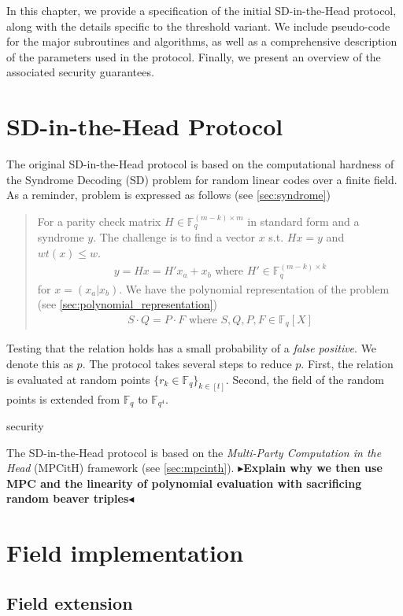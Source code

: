 \documentclass[twoside,11pt]{report}
\theoremstyle{definition}
\theoremstyle{plain}
\newcommand{\todo}[1]{{\color[rgb]{.5,0,0}\textbf{$\blacktriangleright$#1$\blacktriangleleft$}}}
\begin{document}
In this chapter, we provide a specification of the initial SD-in-the-Head protocol, along with the details specific to the threshold variant. We include pseudo-code for the major subroutines and algorithms, as well as a comprehensive description of the parameters used in the protocol. Finally, we present an overview of the associated security guarantees.


\section{SD-in-the-Head Protocol}
The original SD-in-the-Head protocol is based on the computational hardness of the Syndrome Decoding (SD) problem for random linear codes over a finite field. As a reminder, problem is expressed as follows (see \autoref{sec:syndrome})
\begin{quote}
  For a parity check matrix $H \in \mathbb{F}_q^{(m-k)\times m}$ in standard form and a syndrome $y$. The challenge is to find a vector $x$ s.t. $Hx = y$ and $wt(x) \leq w$.
  \begin{align*}
    y = Hx = H'x_a + x_b \text{ \ \ \ where \ \ \ } H' \in \mathbb{F}_q^{(m-k)\times k}
  \end{align*}
  for $x = (x_a | x_b)$. We have the polynomial representation of the problem (see \autoref{sec:polynomial_representation})
  \begin{align*}
    S\cdot Q = P\cdot F \text{ \ \ \ where \ \ \ } S, Q, P, F \in \mathbb{F}_q[X]
  \end{align*}
\end{quote}
\noindent Testing that the relation holds has a small probability of a \textit{false positive}. We denote this as $p$. The protocol takes several steps to reduce $p$. First, the relation is evaluated at random points $\{r_k \in \mathbb{F}_q\}_{k\in[t]}$. Second, the field of the random points is extended from $\mathbb{F}_q$ to $\mathbb{F}_{q^4}$.

security

The SD-in-the-Head protocol is based on the \textit{Multi-Party Computation in the Head} (MPCitH) framework (see \autoref{sec:mpcinth}). \todo{Explain why we then use MPC and the linearity of polynomial evaluation with sacrificing random beaver triples}

\section{Field implementation}

\subsection{Field extension}
\end{document}
